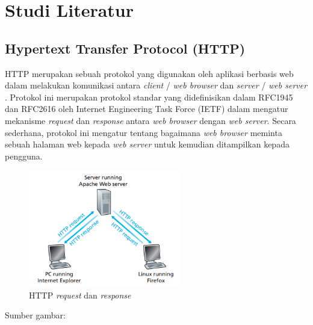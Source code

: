 \chapter{Studi Literatur}


\section{Hypertext Transfer Protocol (HTTP)}
HTTP merupakan sebuah protokol yang digunakan oleh aplikasi berbasis web dalam melakukan komunikasi antara \textit{client} / \textit{web browser} dan \textit{server} / \textit{web server} \citep{kurose2013computer}. Protokol ini merupakan protokol standar yang didefinisikan dalam RFC1945 dan RFC2616 oleh Internet Engineering Task Force (IETF) dalam mengatur mekanisme \textit{request} dan \textit{response} antara \textit{web browser} dengan \textit{web server}. Secara sederhana, protokol ini mengatur tentang bagaimana \textit{web browser} meminta sebuah halaman web kepada \textit{web server} untuk kemudian ditampilkan kepada pengguna.

\begin{figure}
    \centering
    \includegraphics[width=0.6\textwidth]{img/http-behaviour.png}
    \caption{HTTP \textit{request} dan \textit{response}}
    \label{fig:httpBehaviour}
\end{figure}
\vspace{-0.8cm}
\begin{center}
{\small Sumber gambar: \citep{kurose2013computer}}
\end{center}


